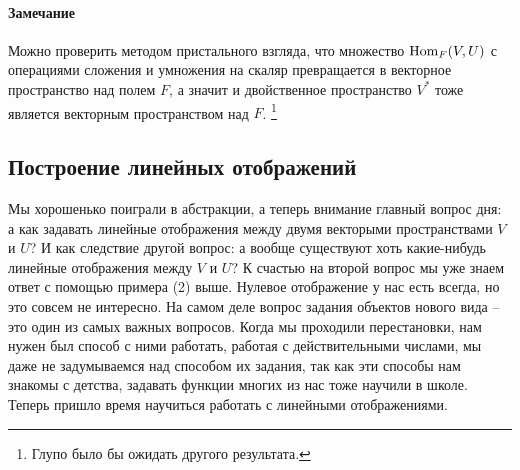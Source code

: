 \paragraph{Замечание}

Можно проверить методом пристального взгляда, что множество $\operatorname{Hom}_F(V,U)$ с операциями сложения и умножения на скаляр превращается в векторное пространство над полем $F$, а значит и двойственное пространство $V^*$ тоже является векторным пространством над $F$.%
\footnote{Глупо было бы ожидать другого результата.}

\subsection{Построение линейных отображений}

Мы хорошенько поиграли в абстракции, а теперь внимание главный вопрос дня: а как задавать линейные отображения между двумя векторыми пространствами $V$ и $U$?
И как следствие другой вопрос: а вообще существуют хоть какие-нибудь линейные отображения между $V$ и $U$?
К счастью на второй вопрос мы уже знаем ответ с помощью примера (2) выше.
Нулевое отображение у нас есть всегда, но это совсем не интересно.
На самом деле вопрос задания объектов нового вида -- это один из самых важных вопросов.
Когда мы проходили перестановки, нам нужен был способ с ними работать, работая с действительными числами, мы даже не задумываемся над способом их задания, так как эти способы нам знакомы с детства, задавать функции многих из нас тоже научили в школе.
Теперь пришло время научиться работать с линейными отображениями.

